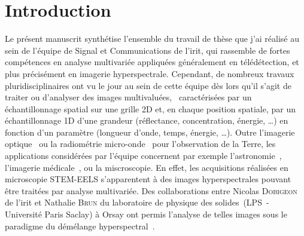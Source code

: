 
\chapter*{Introduction}
\label{ch:introduction}


 
Le présent manuscrit synthétise l'ensemble du travail de thèse que j'ai réalisé au sein de l'équipe de Signal et Communications de l'\gls{irit}, qui rassemble de fortes compétences en analyse multivariée appliquées généralement en télédétection, et plus précisément en imagerie hyperspectrale. Cependant, de nombreux travaux pluridisciplinaires ont vu le jour au sein de cette équipe dès lors qu'il s'agit de traiter ou d'analyser des images multivaluées, \ie\ caractérisées par un échantillonnage spatial sur une grille 2D et, en chaque position spatiale, par un échantillonnage 1D d'une grandeur (réflectance, concentration, énergie, \dots) en fonction d'un paramètre (longueur d'onde, temps, énergie, \dots). Outre l'imagerie optique~\cite{lagrange2020neurocomputing, lagrange2020tgrs} ou la radiométrie micro-onde~\cite{wendt2016detection} pour l'observation de la Terre, les applications considérées par l'équipe concernent par exemple l'astronomie~\cite{guilloteau2020simulated, guilloteau2020fusion}, l'imagerie médicale~\cite{cavalcanti2018unmixing,cavalcanti2019factor}, ou la miscroscopie.
%
En effet, les acquisitions réalisées en microscopie STEM-EELS s'apparentent à des images hyperspectrales pouvant être traitées par analyse multivariée. Des collaborations entre Nicolas \textsc{Dobigeon} de l'\gls{irit} et Nathalie \textsc{Brun} du laboratoire de physique des solides~(LPS~- Université Paris Saclay) à Orsay ont permis l'analyse de telles images sous le paradigme du démélange hyperspectral~\cite{dobigeon2012spectral, dobigeon2016linear}.

